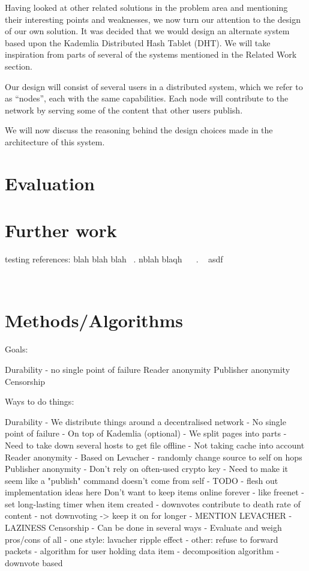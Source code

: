 \documentclass{article}
\begin{document}
Having looked at other related solutions in the problem area and mentioning their interesting points and weaknesses, we now turn our attention to the design of our own solution. It was decided that we would design an alternate system based upon the Kademlia Distributed Hash Tablet (DHT). We will take inspiration from parts of several of the systems mentioned in the Related Work section.

Our design will consist of several users in a distributed system, which we refer to as “nodes”, each with the same capabilities. Each node will contribute to the network by serving some of the content that other users publish.

We will now discuss the reasoning behind the design choices made in the architecture of this system.



\section{Evaluation}

\section{Further work}


testing references: blah blah blah ~\cite{blanchfield}. nblah blaqh ~\cite{levacher} ~\cite{freenet}.
~\cite{opennet}
asdf

~\cite{torrent}

\section{Methods/Algorithms}

Goals:

Durability - no single point of failure
Reader anonymity
Publisher anonymity
Censorship


Ways to do things:

Durability
    - We distribute things around a decentralised network
    - No single point of failure
    - On top of Kademlia (optional)
        - We split pages into parts
        - Need to take down several hosts to get file offline
        - Not taking cache into account
Reader anonymity
    - Based on Levacher - randomly change source to self on hops
Publisher anonymity
    - Don't rely on often-used crypto key
    - Need to make it seem like a "publish" command doesn't come from self
    - TODO - flesh out implementation ideas here
Don't want to keep items online forever
    - like freenet
    - set long-lasting timer when item created
    - downvotes contribute to death rate of content
    - not downvoting -> keep it on for longer
    - MENTION LEVACHER - LAZINESS 
Censorship
    - Can be done in several ways
    - Evaluate and weigh pros/cons of all
    - one style: lavacher ripple effect
    - other: refuse to forward packets
    - algorithm for user holding data item
        - decomposition algorithm
        - downvote based
\end{document}
